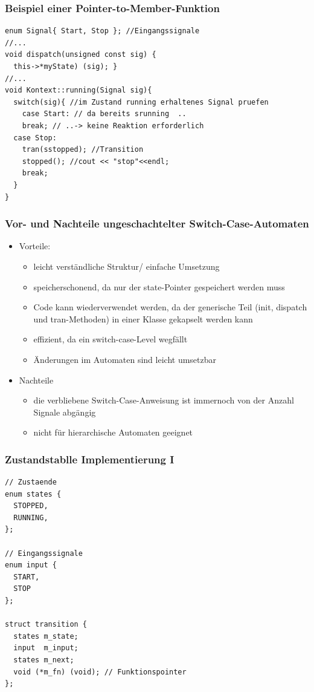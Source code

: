 \documentclass{beamer}
\begin{document}
\begin{frame}[fragile]
  \frametitle{Beispiel einer Pointer-to-Member-Funktion}
  \begin{lstlisting}
enum Signal{ Start, Stop }; //Eingangssignale
//...
void dispatch(unsigned const sig) {
  this->*myState) (sig); } 
//...
void Kontext::running(Signal sig){
  switch(sig){ //im Zustand running erhaltenes Signal pruefen
    case Start: // da bereits srunning  ..
    break; // ..-> keine Reaktion erforderlich
  case Stop:
    tran(sstopped); //Transition
    stopped(); //cout << "stop"<<endl;
    break;
  }
}  
  \end{lstlisting}
\end{frame}

\begin{frame}
  \frametitle{Vor- und Nachteile ungeschachtelter Switch-Case-Automaten}
  \begin{itemize}
    \item Vorteile:
    \begin{itemize}
      \item leicht verst\"andliche Struktur/ einfache Umsetzung
      \item speicherschonend, da nur der state-Pointer gespeichert werden muss
      \item Code kann wiederverwendet werden, da der generische Teil (init, dispatch und tran-Methoden) in einer Klasse gekapselt werden kann
      \item effizient, da ein switch-case-Level wegf\"allt
      \item \"Anderungen im Automaten sind leicht umsetzbar
    \end{itemize}
    \item Nachteile
    \begin{itemize}
      \item die verbliebene Switch-Case-Anweisung ist immernoch von der Anzahl Signale abg\"angig
      \item nicht f\"ur hierarchische Automaten geeignet
    \end{itemize}
  \end{itemize}
\end{frame}

\begin{frame}[fragile]
 \frametitle{Zustandstablle Implementierung I}
 \begin{lstlisting}
// Zustaende
enum states {
  STOPPED,
  RUNNING,
};

// Eingangssignale
enum input {
  START,
  STOP
};

struct transition {
  states m_state;
  input  m_input;
  states m_next;
  void (*m_fn) (void); // Funktionspointer
};
 \end{lstlisting}
\end{frame}
\end{document}

